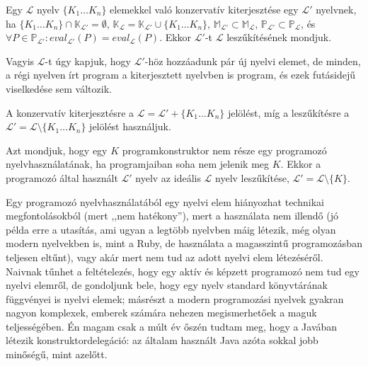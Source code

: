 \begin{defn}
	Egy $\mathcal{L}$ nyelv $\{K_1 \ldots K_n\}$ elemekkel való konzervatív kiterjesztése egy $\mathcal{L}'$ nyelvnek, ha
	$ \{K_1 \ldots K_n\} \cap \mathbb{K}_{\mathcal{L}'} = \emptyset$,
	$\mathbb{K}_\mathcal{L} = \mathbb{K}_{\mathcal{L}'} \cup \{K_1 \ldots K_n\}$,
	$\mathbb{M}_{\mathcal{L}'} \subset \mathbb{M}_\mathcal{L}$, $\mathbb{P}_{\mathcal{L}'} \subset \mathbb{P}_\mathcal{L}$, és $ \forall P \in \mathbb{P}_{\mathcal{L}'}: eval_{\mathcal{L}'}(P) = eval_\mathcal{L}(P)$. Ekkor $\mathcal{L}'$-t $\mathcal{L}$ leszűkítésének mondjuk.

	\normalfont Vagyis $\mathcal{L}$-t úgy kapjuk, hogy $\mathcal{L}'$-höz hozzáadunk pár új nyelvi elemet, de minden, a régi nyelven írt program a kiterjesztett nyelvben is program, és ezek futásidejű viselkedése sem változik.

	\normalfont A konzervatív kiterjesztésre a $\mathcal{L} = \mathcal{L}' + \{K_1 \ldots K_n\}$ jelölést, míg a leszűkítésre a $\mathcal{L}' = \mathcal{L} \setminus \{K_1 \ldots K_n\}$ jelölést használjuk.
\end{defn}


\begin{defn}[Nyelvhasználat]
Azt mondjuk, hogy egy $K$ programkonstruktor nem része egy programozó nyelvhasználatának, ha programjaiban soha nem jelenik meg $K$.
Ekkor a programozó által használt $\mathcal{L}'$ nyelv az ideális $\mathcal{L}$ nyelv leszűkítése, $\mathcal{L}' = \mathcal{L} \setminus \{K\}$.

\normalfont Egy programozó nyelvhasználatából egy nyelvi elem hiányozhat technikai megfontolásokból (mert ,,nem hatékony''), mert a használata nem illendő (jó példa erre a  utasítás, ami ugyan a legtöbb nyelvben máig létezik, még olyan modern nyelvekben is, mint a Ruby, de használata a magasszintű programozásban teljesen eltűnt), vagy akár mert nem tud az adott nyelvi elem létezéséről.
Naivnak tűnhet a feltételezés, hogy egy aktív és képzett programozó nem tud egy nyelvi elemről, de gondoljunk bele, hogy egy nyelv standard könyvtárának függvényei is nyelvi elemek; másrészt a modern programozási nyelvek gyakran nagyon komplexek, emberek számára nehezen megismerhetőek a maguk teljességében.
Én magam csak a múlt év őszén tudtam meg, hogy a Javában létezik konstruktordelegáció: az általam használt Java azóta sokkal jobb minőségű, mint azelőtt.
\end{defn}
